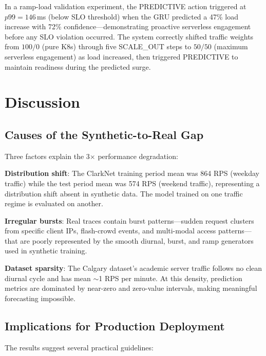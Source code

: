 \documentclass[conference,letterpaper]{IEEEtran}
\begin{document}
In a ramp-load validation experiment, the PREDICTIVE action triggered at $p99 = 146$\,ms (below SLO threshold) when the GRU predicted a 47\% load increase with 72\% confidence---demonstrating proactive serverless engagement before any SLO violation occurred. The system correctly shifted traffic weights from $100/0$ (pure K8s) through five SCALE\_OUT steps to $50/50$ (maximum serverless engagement) as load increased, then triggered PREDICTIVE to maintain readiness during the predicted surge.

\section{Discussion}

\subsection{Causes of the Synthetic-to-Real Gap}

Three factors explain the 3$\times$ performance degradation:

\textbf{Distribution shift}: The ClarkNet training period mean was 864 RPS (weekday traffic) while the test period mean was 574 RPS (weekend traffic), representing a distribution shift absent in synthetic data. The model trained on one traffic regime is evaluated on another.

\textbf{Irregular bursts}: Real traces contain burst patterns---sudden request clusters from specific client IPs, flash-crowd events, and multi-modal access patterns---that are poorly represented by the smooth diurnal, burst, and ramp generators used in synthetic training.

\textbf{Dataset sparsity}: The Calgary dataset's academic server traffic follows no clean diurnal cycle and has mean $\sim$1 RPS per minute. At this density, prediction metrics are dominated by near-zero and zero-value intervals, making meaningful forecasting impossible.

\subsection{Implications for Production Deployment}

The results suggest several practical guidelines:
\end{document}

